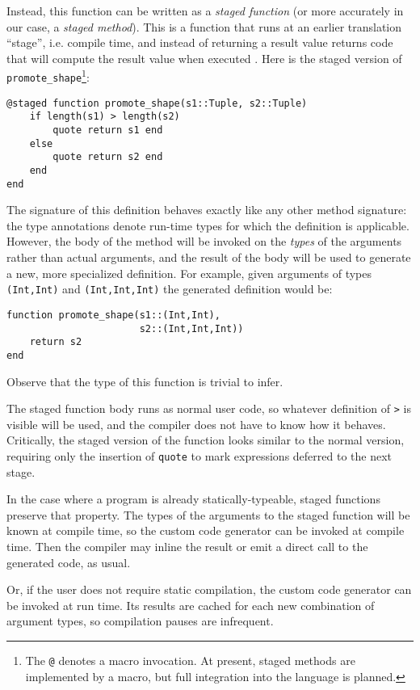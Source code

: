 \documentclass[9pt]{sigplanconf}
\begin{document}
Instead, this function can be written as a \emph{staged function} (or
more accurately in our case, a \emph{staged method}). This is a function
that runs at an earlier translation ``stage'', i.e. compile time, and
instead of returning a result value returns code that will compute the
result value when executed \cite{staging}.
Here is the staged version of
{\tt promote\_shape}\footnote{The {\tt @} denotes a macro invocation. At
present, staged methods are implemented by a macro, but full integration
into the language is planned.}:

\begin{verbatim}
@staged function promote_shape(s1::Tuple, s2::Tuple)
    if length(s1) > length(s2)
        quote return s1 end
    else
        quote return s2 end
    end
end
\end{verbatim}

The signature of this definition behaves exactly like any other method
signature: the type annotations denote run-time types for which the
definition is applicable. However, the body of the method will be invoked
on the \emph{types} of the arguments rather than actual arguments, and the
result of the body will be used to generate a new, more specialized
definition. For example, given arguments of types
{\tt (Int,Int)} and {\tt (Int,Int,Int)} the generated definition would be:

\begin{verbatim}
function promote_shape(s1::(Int,Int),
                       s2::(Int,Int,Int))
    return s2
end
\end{verbatim}

Observe that the type of this function is trivial to infer.

The staged function body runs as normal user code, so whatever definition
of {\tt >} is visible will be used, and the compiler does not have to know
how it behaves. Critically, the staged version of the function looks
similar to the normal version, requiring only the insertion of {\tt quote}
to mark expressions deferred to the next stage.

In the case where a program is already statically-typeable, staged
functions preserve that property. The types of the arguments to the
staged function will be known at compile time, so the custom code
generator can be invoked at compile time. Then the compiler may inline
the result or emit a direct call to the generated code, as usual.

Or, if the user does not require static compilation, the custom code
generator can be invoked at run time. Its results are cached for each new
combination of argument types, so compilation pauses are infrequent.
\end{document}
